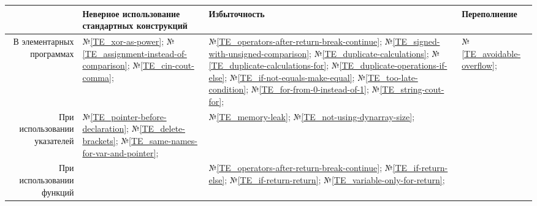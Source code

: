 \begin{center}
	\begin{tabular}{|r|m{4.5cm}|m{4cm}|m{4cm}|}\hline
		 & Неверное использование стандартных конструкций & Избыточность & Переполнение
		\\\hline
			В элементарных программах
		& 
			№\ref{TE_xor-as-power};
			№\ref{TE_assignment-instead-of-comparison};
			№\ref{TE_cin-cout-comma};
		&
			№\ref{TE_operators-after-return-break-continue}; %
			№\ref{TE_signed-with-unsigned-comparison};
			№\ref{TE_duplicate-calculations};
			№\ref{TE_duplicate-calculations-for};
			№\ref{TE_duplicate-operations-if-else};
			№\ref{TE_if-not-equals-make-equal};
			№\ref{TE_too-late-condition};
			№\ref{TE_for-from-0-instead-of-1};
			№\ref{TE_string-cout-for};
		&
			№\ref{TE_avoidable-overflow};
		\\\hline
			При использовании указателей
		&
			№\ref{TE_pointer-before-declaration};
			№\ref{TE_delete-brackets};
			№\ref{TE_same-names-for-var-and-pointer};
		&
			№\ref{TE_memory-leak};
			№\ref{TE_not-using-dynarray-size};
		&
		\\\hline
		При использовании функций
		&
		&
			№\ref{TE_operators-after-return-break-continue}; %
			№\ref{TE_if-return-else};
			№\ref{TE_if-return-return};
			№\ref{TE_variable-only-for-return};
		&
		\\\hline
	\end{tabular}
\end{center}
